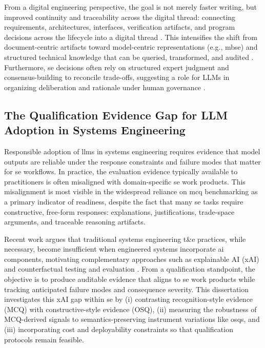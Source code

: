 From a digital engineering perspective, the goal is not merely faster writing, but improved continuity and traceability across the digital thread: connecting requirements, architectures, interfaces, verification artifacts, and program decisions across the lifecycle into a digital thread \cite{Feng_Guiding_LLMs_Engineering_Design_Process_Domain_Specific_Knowledge_2025, Jaskie_Agentic_AI_Lifecycle_Traceability_Digital_Thread_2025}. This intensifies the shift from document-centric artifacts toward model-centric representations (e.g., \ac{mbse}) and structured technical knowledge that can be queried, transformed, and audited \cite{estefanSurveyModelBasedSystems2008, harvey_document_model_dont_model_document_2012, jones_digital_systems_engineering_transformation_strategy_2020}. Furthermore, \ac{se} decisions often rely on structured expert judgment and consensus-building to reconcile trade-offs, suggesting a role for LLMs in organizing deliberation and rationale under human governance \cite{bell_AutomatingAIExpert_2025}. 

\subsection{The Qualification Evidence Gap for LLM Adoption in Systems Engineering}\label{subsec:motivation_qualification_gap}

Responsible adoption of \acp{llm} in systems engineering requires evidence that model outputs are reliable under the response constraints and failure modes that matter for \ac{se} workflows. In practice, the evaluation evidence typically available to practitioners is often misaligned with domain-specific \ac{se} work products. This misalignment is most visible in the widespread reliance on \ac{mcq} benchmarking as a primary indicator of readiness, despite the fact that many \ac{se} tasks require constructive, free-form responses: explanations, justifications, trade-space arguments, and traceable reasoning artifacts. 

Recent work argues that traditional systems engineering \ac{t&e} practices, while necessary, become insufficient when engineered systems incorporate \ac{ai} components, motivating complementary approaches such as explainable AI (xAI) and counterfactual testing and evaluation \cite{raz_ExplainableAICounterfactuals_2023}. From a qualification standpoint, the objective is to produce auditable evidence that aligns to \ac{se} work products while tracking anticipated failure modes and consequence severity. This dissertation investigates this xAI gap within \ac{se} by (i) contrasting recognition-style evidence (MCQ) with constructive-style evidence (OSQ), (ii) measuring the robustness of MCQ-derived signals to semantics-preserving instrument variations like \acp{osq}, and (iii) incorporating cost and deployability constraints so that qualification protocols remain feasible.


